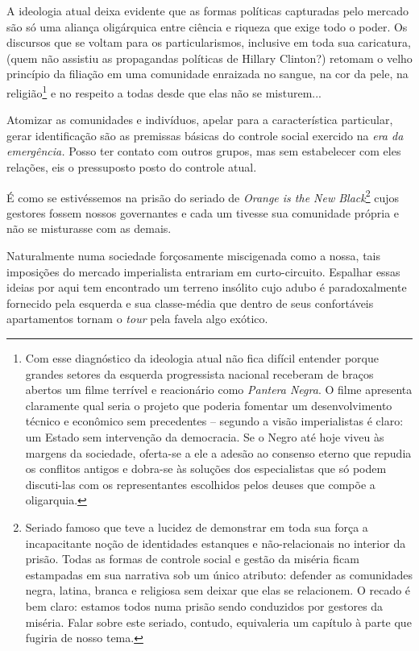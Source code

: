 A ideologia atual deixa evidente que as formas políticas capturadas pelo
mercado são só uma aliança oligárquica entre ciência e riqueza que exige
todo o poder. Os discursos que se voltam para os particularismos,
inclusive em toda sua caricatura, (quem não assistiu as propagandas
políticas de Hillary Clinton?) retomam o velho princípio da filiação em
uma comunidade enraizada no sangue, na cor da pele, na
religião\footnote{Com esse diagnóstico da ideologia atual não fica
  difícil entender porque grandes setores da esquerda progressista
  nacional receberam de braços abertos um filme terrível e reacionário
  como \emph{Pantera Negra}. O filme apresenta claramente qual seria o
  projeto que poderia fomentar um desenvolvimento técnico e econômico
  sem precedentes -- segundo a visão imperialistas é claro: um Estado
  sem intervenção da democracia. Se o Negro até hoje viveu às margens da
  sociedade, oferta-se a ele a adesão ao consenso eterno que repudia os
  conflitos antigos e dobra-se às soluções dos especialistas que só
  podem discuti-las com os representantes escolhidos pelos deuses que
  compõe a oligarquia.} e no respeito a todas desde que elas não se
misturem...

Atomizar as comunidades e indivíduos, apelar para a característica
particular, gerar identificação são as premissas básicas do controle
social exercido na \emph{era da emergência.} Posso ter contato com
outros grupos, mas sem estabelecer com eles relações, eis o pressuposto
posto do controle atual.

É como se estivéssemos na prisão do seriado de \emph{Orange is the New
Black}\footnote{Seriado famoso que teve a lucidez de demonstrar em toda
  sua força a incapacitante noção de identidades estanques e
  não-relacionais no interior da prisão. Todas as formas de controle
  social e gestão da miséria ficam estampadas em sua narrativa sob um
  único atributo: defender as comunidades negra, latina, branca e
  religiosa sem deixar que elas se relacionem. O recado é bem claro:
  estamos todos numa prisão sendo conduzidos por gestores da miséria.
  Falar sobre este seriado, contudo, equivaleria um capítulo à parte que
  fugiria de nosso tema.} cujos gestores fossem nossos governantes e
cada um tivesse sua comunidade própria e não se misturasse com as
demais.

Naturalmente numa sociedade forçosamente miscigenada como a nossa, tais
imposições do mercado imperialista entrariam em curto-circuito. Espalhar
essas ideias por aqui tem encontrado um terreno insólito cujo adubo é
paradoxalmente fornecido pela esquerda e sua classe-média que dentro de
seus confortáveis apartamentos tornam o \emph{tour} pela favela algo
exótico.

